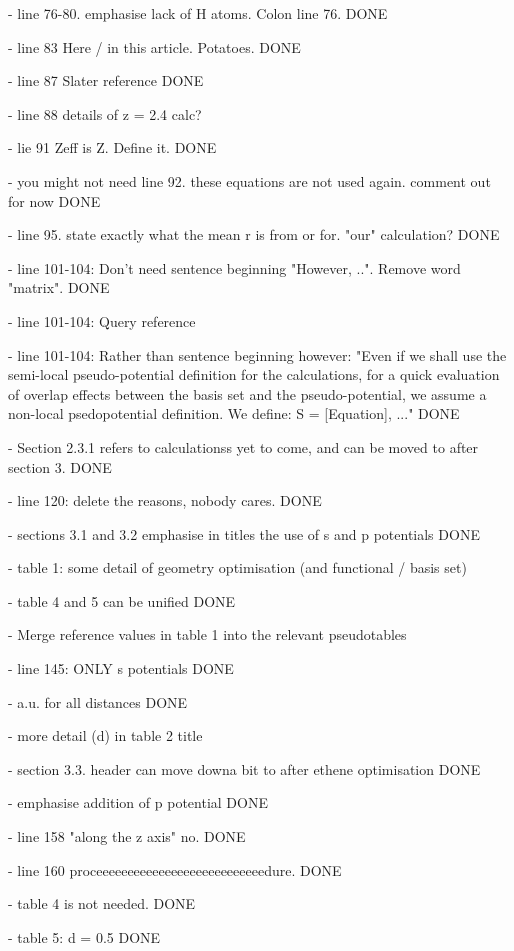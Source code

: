 \documentclass[journal=jctcce,manuscript=article]{achemso}
\begin{document}
- line 76-80. emphasise lack of H atoms. Colon line 76. DONE

- line 83 Here / in this article. Potatoes. DONE

- line 87 Slater reference DONE

- line 88 details of z = 2.4 calc?

- lie 91 Zeff is Z. Define it. DONE

- you might not need line 92. these equations are not used again. comment out for now DONE

- line 95. state exactly what the mean r is from or for. "our" calculation? DONE

- line 101-104: Don't need sentence beginning "However, ..". Remove word "matrix". DONE

- line 101-104: Query reference

- line 101-104: Rather than sentence beginning however: "Even if we shall use the semi-local pseudo-potential definition for the calculations, for a 
quick evaluation of overlap effects between the basis set and the pseudo-potential, we assume a non-local psedopotential definition. We define: S = [Equation], ..." DONE

- Section 2.3.1 refers to calculationss yet to come, and can be moved to after section 3. DONE

- line 120: delete the reasons, nobody cares. DONE

- sections 3.1 and 3.2 emphasise in titles the use of s and p potentials DONE

- table 1: some detail of geometry optimisation (and functional / basis set)

- table 4 and 5 can be unified DONE

- Merge reference values in table 1 into the relevant pseudotables

- line 145: ONLY s potentials DONE

- a.u. for all distances DONE

- more detail (d) in table 2 title

- section 3.3. header can move downa  bit to after ethene optimisation DONE

- emphasise addition of p potential DONE

- line 158 "along the z axis" no. DONE

- line 160 proceeeeeeeeeeeeeeeeeeeeeeeeeeedure. DONE

- table 4 is not needed. DONE

- table 5: d = 0.5 DONE
\end{document}
